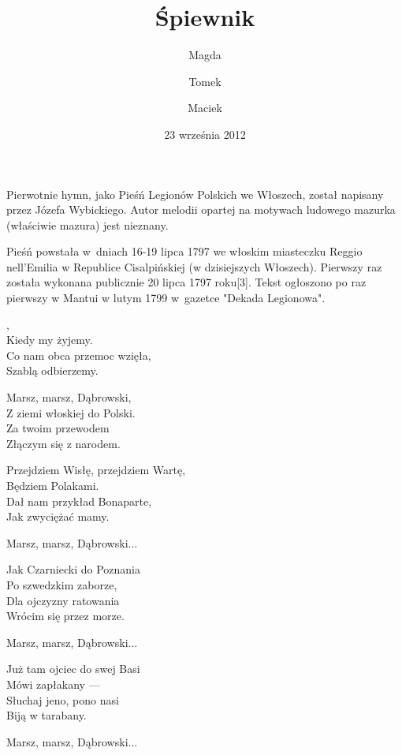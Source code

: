 \documentclass[12pt,a4paper,twoside]{songbook}
\title{Śpiewnik}
\date{23 września 2012}
\author{Magda \and Tomek \and Maciek}
\begin{document}
\maketitle
{}


  \begin{info}
    Pierwotnie hymn, jako Pieśń Legionów Polskich we Włoszech, został
    napisany przez Józefa Wybickiego. Autor melodii opartej na motywach
    ludowego mazurka (właściwie mazura) jest nieznany.

    Pieśń powstała w~dniach 16-19 lipca 1797 we włoskim miasteczku
    Reggio nell'Emilia w Republice Cisalpińskiej (w dzisiejszych
    Włoszech). Pierwszy raz została wykonana publicznie 20 lipca 1797
    roku[3]. Tekst ogłoszono po raz pierwszy w Mantui w lutym 1799
    w~gazetce "Dekada Legionowa".
  \end{info}
  
  \begin{lyrics}
    ,\\
    Kiedy my żyjemy.\\
    Co nam obca przemoc wzięła,\\
    Szablą odbierzemy.

    Marsz, marsz, Dąbrowski,\\
    Z ziemi włoskiej do Polski.\\
    Za twoim przewodem\\
    Złączym się z narodem.

    Przejdziem Wisłę, przejdziem Wartę,\\
    Będziem Polakami.\\
    Dał nam przykład Bonaparte,\\
    Jak zwyciężać mamy.
      
    Marsz, marsz, Dąbrowski...

    Jak Czarniecki do Poznania\\
    Po szwedzkim zaborze,\\
    Dla ojczyzny ratowania\\
    Wrócim się przez morze.
    
    Marsz, marsz, Dąbrowski...

    Już tam ojciec do swej Basi\\
    Mówi zapłakany —\\
    Słuchaj jeno, pono nasi\\
    Biją w tarabany.

    Marsz, marsz, Dąbrowski...
  \end{lyrics}
\end{document}
